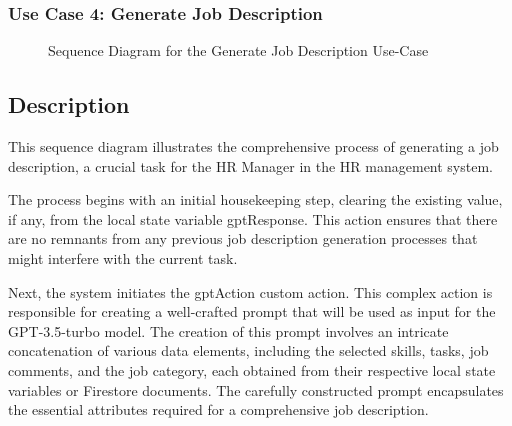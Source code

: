 \newpage
\subsubsection{Use Case 4: Generate Job Description} 

\begin{figure}[H]
    \centering
    \caption{ Sequence Diagram for the Generate Job Description Use-Case }
    \label{fig:UseCase4Sprint2_Sequence_Diagram}
\end{figure}

\newpage
\subsection*{Description}
This sequence diagram illustrates the comprehensive process of generating a job description, a crucial task for the HR Manager in the HR management system.

The process begins with an initial housekeeping step, clearing the existing value, if any, from the local state variable gptResponse. This action ensures that there are no remnants from any previous job description generation processes that might interfere with the current task.

Next, the system initiates the gptAction custom action. This complex action is responsible for creating a well-crafted prompt that will be used as input for the GPT-3.5-turbo model. The creation of this prompt involves an intricate concatenation of various data elements, including the selected skills, tasks, job comments, and the job category, each obtained from their respective local state variables or Firestore documents. The carefully constructed prompt encapsulates the essential attributes required for a comprehensive job description.

